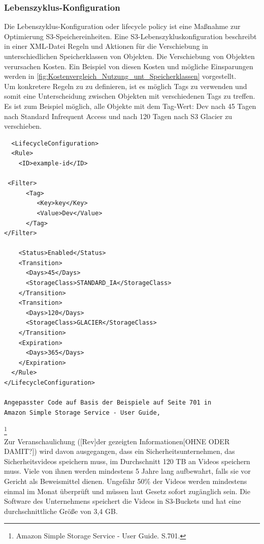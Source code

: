 \subsubsection{Lebenszyklus-Konfiguration}
Die Lebenszyklus-Konfiguration oder lifecycle policy ist eine Maßnahme zur Optimierung S3-Speichereinheiten. Eine S3-Lebenszykluskonfiguration beschreibt in einer XML-Datei Regeln und Aktionen für die Verschiebung in unterschiedlichen Speicherklassen von Objekten. Die Verschiebung von Objekten verursachen Kosten. Ein Beispiel von diesen Kosten und mögliche Einsparungen werden in \autoref{fig:Kostenvergleich_Nutzung_unt_Speicherklassen} vorgestellt.
\\
Um konkretere Regeln zu zu definieren, ist es möglich Tags zu verwenden und somit eine Unterscheidung zwischen Objekten mit verschiedenen Tags zu treffen. Es ist zum Beispiel möglich, alle Objekte mit dem Tag-Wert: Dev nach 45 Tagen nach Standard Infrequent Access und nach 120 Tagen nach S3 Glacier zu verschieben.
\begin{lstlisting}
  <LifecycleConfiguration>
  <Rule>
    <ID>example-id</ID>
    
 <Filter>
      <Tag>
         <Key>key</Key>
         <Value>Dev</Value>
      </Tag>
</Filter>

    <Status>Enabled</Status>
    <Transition>
      <Days>45</Days>
      <StorageClass>STANDARD_IA</StorageClass>
    </Transition>
    <Transition>
      <Days>120</Days>
      <StorageClass>GLACIER</StorageClass>
    </Transition>
    <Expiration>
      <Days>365</Days>
    </Expiration>
  </Rule>
</LifecycleConfiguration>

Angepasster Code auf Basis der Beispiele auf Seite 701 in 
Amazon Simple Storage Service - User Guide, 
\end{lstlisting}
\footnote{Amazon Simple Storage Service - User Guide. S.701.\cite{AMZ18}}\\
Zur Veranschaulichung ([Rev]der gezeigten Informationen[OHNE ODER DAMIT?]) wird davon ausgegangen, dass ein Sicherheitsunternehmen, das Sicherheitsvideos speichern muss, im Durchschnitt 120 TB an Videos speichern muss. Viele von ihnen werden mindestens 5 Jahre lang aufbewahrt, falls sie vor Gericht als Beweismittel dienen. Ungefähr 50\% der Videos werden mindestens einmal im Monat überprüft und müssen laut Gesetz sofort zugänglich sein. Die Software des Unternehmens speichert die Videos in S3-Buckets und hat eine durchschnittliche Größe von 3,4 GB.

